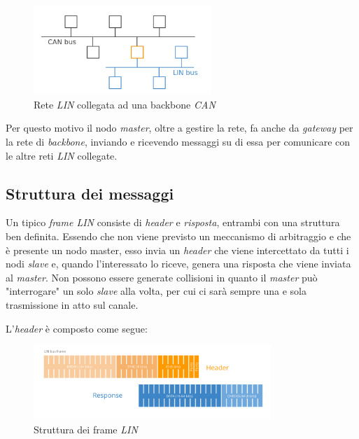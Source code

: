 \begin{figure}[h]
    \centering
    \includegraphics[width=0.6\textwidth]{capitoli/figure-protocolli/lin-bus-can.png}
    \caption{Rete \emph{LIN} collegata ad una backbone \emph{CAN}}
    \label{fig:lin-can-backbone}
\end{figure}

Per questo motivo il nodo \emph{master}, oltre a gestire la rete, fa anche da \emph{gateway} per la rete di \emph{backbone}, inviando e ricevendo messaggi su di essa per comunicare con le altre reti \emph{LIN} collegate.

\subsection{Struttura dei messaggi}
Un tipico \emph{frame LIN} consiste di \emph{header} e \emph{risposta}, entrambi con una struttura ben definita. Essendo che non viene previsto un meccanismo di arbitraggio e che è presente un nodo master, esso invia un \emph{header} che viene intercettato da tutti i nodi \emph{slave} e, quando l'interessato lo riceve, genera una risposta che viene inviata al \emph{master}. Non possono essere generate collisioni in quanto il \emph{master} può "interrogare" un solo \emph{slave} alla volta, per cui ci sarà sempre una e sola trasmissione in atto sul canale.

L'\emph{header} è composto come segue:

\begin{figure}[h]
    \centering
    \includegraphics[width=0.8\textwidth]{capitoli/figure-protocolli/lin-frame-format.png}
    \caption{Struttura dei frame \emph{LIN}}
    \label{fig:lin-frame-structure}
\end{figure}

